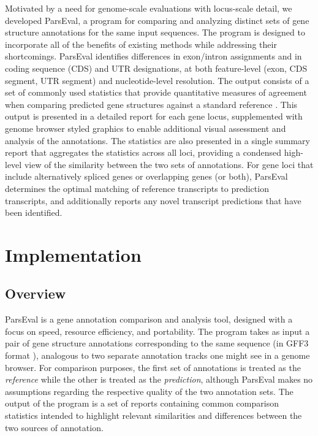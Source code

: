 Motivated by a need for genome-scale evaluations with locus-scale detail, we developed ParsEval, a program for comparing and analyzing distinct sets of gene structure annotations for the same input sequences.
The program is designed to incorporate all of the benefits of existing methods while addressing their shortcomings.
ParsEval identifies differences in exon/intron assignments and in coding sequence (CDS) and UTR designations, at both feature-level (exon, CDS segment, UTR segment) and nucleotide-level resolution.
The output consists of a set of commonly used statistics that provide quantitative measures of agreement when comparing predicted gene structures against a standard reference \citep{Burset,Zhao,Eilbeck}.
This output is presented in a detailed report for each gene locus, supplemented with genome browser styled graphics to enable additional visual assessment and analysis of the annotations.
The statistics are also presented in a single summary report that aggregates the statistics across all loci, providing a condensed high-level view of the similarity between the two sets of annotations.
For gene loci that include alternatively spliced genes or overlapping genes (or both), ParsEval determines the optimal matching of reference transcripts to prediction transcripts, and additionally reports any novel transcript predictions that have been identified.

\section{Implementation}

\subsection{Overview}
ParsEval is a gene annotation comparison and analysis tool, designed with a focus on speed, resource efficiency, and portability.
The program takes as input a pair of gene structure annotations corresponding to the same sequence (in GFF3 format \citep{SO}), analogous to two separate annotation tracks one might see in a genome browser.
For comparison purposes, the first set of annotations is treated as the \emph{reference} while the other is treated as the \emph{prediction}, although ParsEval makes no assumptions regarding the respective quality of the two annotation sets.
The output of the program is a set of reports containing common comparison statistics intended to highlight relevant similarities and differences between the two sources of annotation.

